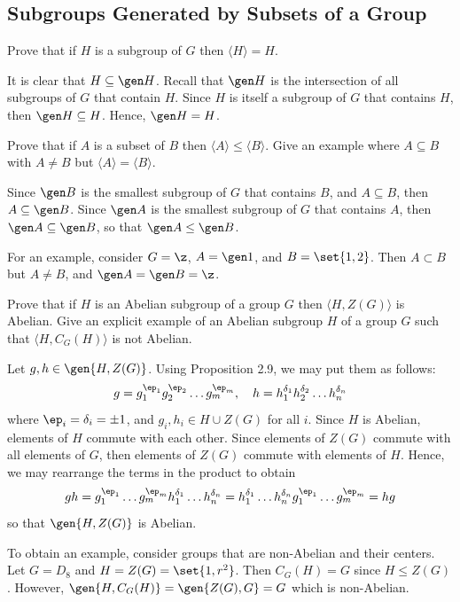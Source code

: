\newpage

\subsection{Subgroups Generated by Subsets of a Group}

\begin{exercise}\label{ex2.4.1}
    Prove that if $H$ is a subgroup of $G$ then $\langle H\rangle = H$.
\end{exercise}

\begin{sol}
    It is clear that $H \subseteq \gen H$. Recall that $\gen H$ is the intersection of all subgroups of $G$ that contain $H$. Since $H$ is itself a subgroup of $G$ that contains $H$, then $\gen H \subseteq H$. Hence, $\gen H = H$.
\end{sol}

\begin{exercise}\label{ex2.4.2}
    Prove that if $A$ is a subset of $B$ then $\langle A\rangle \le \langle B\rangle$. Give an example where $A \subseteq B$ with $A \ne B$ but $\langle A\rangle = \langle B\rangle$.
\end{exercise}

\begin{sol}
    Since $\gen B$ is the smallest subgroup of $G$ that contains $B$, and $A \subseteq B$, then $A \subseteq \gen B$. Since $\gen A$ is the smallest subgroup of $G$ that contains $A$, then $\gen A \subseteq \gen B$, so that $\gen A \leq \gen B$.

    For an example, consider $G = \z$, $A = \gen 1$, and $B = \set{1, 2}$. Then $A \subset B$ but $A \neq B$, and $\gen A = \gen B = \z$.
\end{sol}

\begin{exercise}\label{ex2.4.3}
    Prove that if $H$ is an Abelian subgroup of a group $G$ then $\langle H, Z(G)\rangle$ is Abelian. Give an explicit example of an Abelian subgroup $H$ of a group $G$ such that $\langle H, C_G(H)\rangle$ is not Abelian.
\end{exercise}

\begin{sol}
    Let $g, h \in \gen{H, Z(G)}$. Using Proposition 2.9, we may put them as follows:
    \[g = g_1^{\ep_1}g_2^{\ep_2} \ldots g_m^{\ep_m}, \quad h = h_1^{\delta_1}h_2^{\delta_2} \ldots h_n^{\delta_n}\]
    where $\ep_i = \delta_i = \pm 1$, and $g_i, h_i \in H \cup Z(G)$ for all $i$. Since $H$ is Abelian, elements of $H$ commute with each other. Since elements of $Z(G)$ commute with all elements of $G$, then elements of $Z(G)$ commute with elements of $H$. Hence, we may rearrange the terms in the product to obtain
    \[gh = g_1^{\ep_1} \ldots g_m^{\ep_m}h_1^{\delta_1} \ldots h_n^{\delta_n} = h_1^{\delta_1} \ldots h_n^{\delta_n}g_1^{\ep_1} \ldots g_m^{\ep_m} = hg\]
    so that $\gen{H, Z(G)}$ is Abelian.

    To obtain an example, consider groups that are non-Abelian and their centers. Let $G = D_8$ and $H = Z(G) = \set{1, r^2}$. Then $C_G(H) = G$ since $H \leq Z(G)$. However, $\gen{H, C_G(H)} = \gen{Z(G), G} = G$ which is non-Abelian.
\end{sol}

